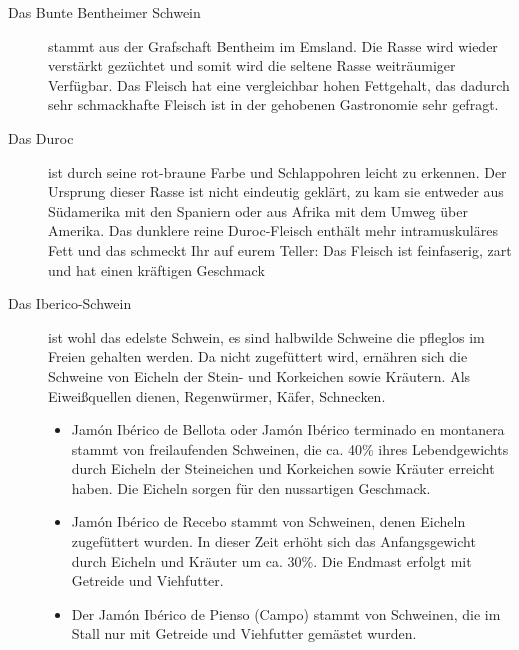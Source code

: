 \begin{description}
	\item[Das Bunte Bentheimer Schwein] stammt aus der Grafschaft 
	Bentheim im Emsland. Die Rasse wird wieder verstärkt gezüchtet und 
	somit wird die seltene Rasse weiträumiger Verfügbar. Das Fleisch hat 
	eine vergleichbar hohen Fettgehalt, das dadurch sehr schmackhafte 
	Fleisch ist in der gehobenen Gastronomie sehr gefragt.
	\item[Das Duroc] ist durch seine rot-braune Farbe und Schlappohren 
	leicht zu erkennen. Der Ursprung dieser Rasse ist nicht eindeutig 
	geklärt, zu kam sie entweder aus Südamerika mit den Spaniern oder 
	aus Afrika mit dem Umweg über Amerika. Das dunklere reine 
	Duroc-Fleisch enthält mehr intramuskuläres Fett und das schmeckt 
	Ihr auf eurem Teller: Das Fleisch ist feinfaserig, zart und hat einen 
	kräftigen Geschmack
	\item[Das Iberico-Schwein] ist wohl das edelste Schwein, es sind 
	halbwilde Schweine die pfleglos im Freien gehalten werden. Da nicht 
	zugefüttert wird, ernähren sich die Schweine von Eicheln der Stein- 
	und Korkeichen sowie Kräutern. Als Eiweißquellen dienen, 
	Regenwürmer, Käfer, Schnecken. 
	\begin{itemize}[noitemsep]
		\item Jamón Ibérico de Bellota oder Jamón Ibérico terminado en 
		montanera stammt von freilaufenden Schweinen, die ca. 40\% ihres 
		Lebendgewichts durch Eicheln der Steineichen und Korkeichen 
		sowie Kräuter erreicht haben. Die Eicheln sorgen für den nussartigen 
		Geschmack.
		\item Jamón Ibérico de Recebo stammt von Schweinen, denen Eicheln 
		zugefüttert wurden. In dieser Zeit erhöht sich das Anfangsgewicht 
		durch Eicheln und Kräuter um ca. 30\%. Die Endmast erfolgt mit 
		Getreide und Viehfutter.
		\item Der Jamón Ibérico de Pienso (Campo) stammt von Schweinen, 
		die im Stall nur mit Getreide und Viehfutter gemästet wurden.
	\end{itemize}
\end{description}




